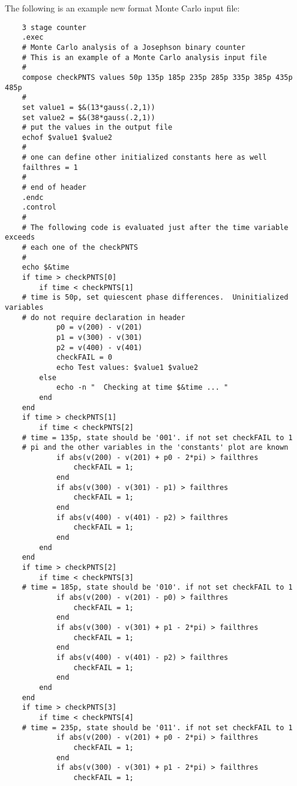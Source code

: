 
The following is an example new format Monte Carlo input file:

\begin{verbatim}
    3 stage counter
    .exec
    # Monte Carlo analysis of a Josephson binary counter
    # This is an example of a Monte Carlo analysis input file
    #
    compose checkPNTS values 50p 135p 185p 235p 285p 335p 385p 435p 485p
    #
    set value1 = $&(13*gauss(.2,1))
    set value2 = $&(38*gauss(.2,1))
    # put the values in the output file
    echof $value1 $value2
    #
    # one can define other initialized constants here as well
    failthres = 1
    #
    # end of header
    .endc
    .control
    #
    # The following code is evaluated just after the time variable exceeds
    # each one of the checkPNTS
    #
    echo $&time
    if time > checkPNTS[0]
        if time < checkPNTS[1]
    # time is 50p, set quiescent phase differences.  Uninitialized variables
    # do not require declaration in header
            p0 = v(200) - v(201)
            p1 = v(300) - v(301)
            p2 = v(400) - v(401)
            checkFAIL = 0
            echo Test values: $value1 $value2
        else
            echo -n "  Checking at time $&time ... "
        end
    end
    if time > checkPNTS[1]
        if time < checkPNTS[2]
    # time = 135p, state should be '001'. if not set checkFAIL to 1
    # pi and the other variables in the 'constants' plot are known
            if abs(v(200) - v(201) + p0 - 2*pi) > failthres
                checkFAIL = 1;
            end
            if abs(v(300) - v(301) - p1) > failthres
                checkFAIL = 1;
            end
            if abs(v(400) - v(401) - p2) > failthres
                checkFAIL = 1;
            end
        end
    end
    if time > checkPNTS[2]
        if time < checkPNTS[3]
    # time = 185p, state should be '010'. if not set checkFAIL to 1
            if abs(v(200) - v(201) - p0) > failthres
                checkFAIL = 1;
            end
            if abs(v(300) - v(301) + p1 - 2*pi) > failthres
                checkFAIL = 1;
            end
            if abs(v(400) - v(401) - p2) > failthres
                checkFAIL = 1;
            end
        end
    end
    if time > checkPNTS[3]
        if time < checkPNTS[4]
    # time = 235p, state should be '011'. if not set checkFAIL to 1
            if abs(v(200) - v(201) + p0 - 2*pi) > failthres
                checkFAIL = 1;
            end
            if abs(v(300) - v(301) + p1 - 2*pi) > failthres
                checkFAIL = 1;

\end{verbatim}
